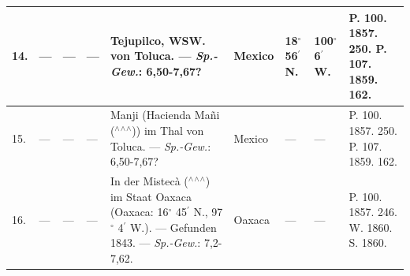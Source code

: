\documentclass[a4paper, 8pt, oneside, polutonikogreek, german]{article}
\begin{document}
\begin{center}
\begin{longtable}{|p{3mm}|p{7mm}|p{16mm}|p{11mm}|p{25mm}|p{16mm}|p{13mm}|p{13mm}|p{13mm}|}
        14. & --- & --- & --- & Tejupilco, WSW. von Toluca. --- \emph{Sp.-Gew.}: 6,50-7,67? & Mexico & 18$^\circ$ 56$^\prime$ N. & 100$^\circ$ 6$^\prime$ W. & P. 100. 1857. 250. P. 107. 1859. 162. \\ \hline
        15. & --- & --- & --- & Manji (Hacienda Mañi ($^\wedge$$^\wedge$$^\wedge$)) im Thal von Toluca. --- \emph{Sp.-Gew.}: 6,50-7,67? & Mexico & --- & --- & P. 100. 1857. 250. P. 107. 1859. 162. \\ \hline
        16. & --- & --- & --- & In der Mistecà ($^\wedge$$^\wedge$$^\wedge$) im Staat Oaxaca (Oaxaca: 16$^\circ$ 45$^\prime$ N., 97$^\circ$ 4$^\prime$ W.). --- Gefunden 1843. --- \emph{Sp.-Gew.}: 7,2-7,62. & Oaxaca & --- & --- & P. 100. 1857. 246. W. 1860. S. 1860. \\ \hline
    \end{longtable}
\end{center}
\end{document}
